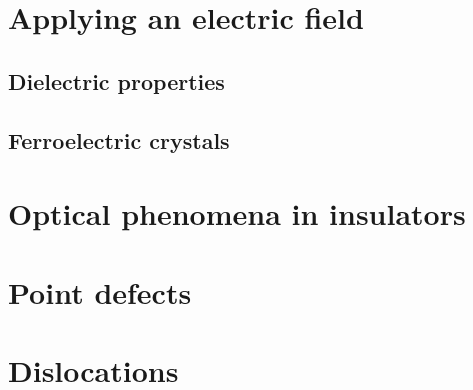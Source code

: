 \chapter{Applying an electric field}
\section{Dielectric properties}
\section{Ferroelectric crystals}

\chapter{Optical phenomena in insulators}
\chapter{Point defects}
\chapter{Dislocations}